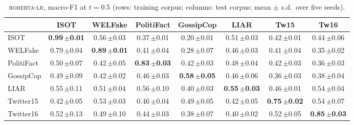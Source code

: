 \begin{table}[h]
\centering
\caption{\textsc{roberta-lr}, macro-F1 at $t=0.5$ (rows: training corpus; columns: test corpus; mean $\pm$ s.d.\ over five seeds).}
\scriptsize
\begin{tabular}{@{}lccccccc@{}}
\toprule
 & ISOT & WELFake & PolitiFact & GossipCop & LIAR & Tw15 & Tw16 \\
\midrule
ISOT & \textbf{0.99\,{\tiny$\pm$0.01}} & 0.56\,{\tiny$\pm$0.03} & 0.37\,{\tiny$\pm$0.01} & 0.20\,{\tiny$\pm$0.01} & 0.51\,{\tiny$\pm$0.03} & 0.42\,{\tiny$\pm$0.01} & 0.44\,{\tiny$\pm$0.06} \\
WELFake & 0.79\,{\tiny$\pm$0.04} & \textbf{0.89\,{\tiny$\pm$0.01}} & 0.41\,{\tiny$\pm$0.04} & 0.28\,{\tiny$\pm$0.07} & 0.46\,{\tiny$\pm$0.03} & 0.41\,{\tiny$\pm$0.04} & 0.35\,{\tiny$\pm$0.02} \\
PolitiFact & 0.50\,{\tiny$\pm$0.07} & 0.42\,{\tiny$\pm$0.05} & \textbf{0.83\,{\tiny$\pm$0.03}} & 0.42\,{\tiny$\pm$0.03} & 0.48\,{\tiny$\pm$0.04} & 0.42\,{\tiny$\pm$0.03} & 0.36\,{\tiny$\pm$0.03} \\
GossipCop & 0.49\,{\tiny$\pm$0.09} & 0.42\,{\tiny$\pm$0.02} & 0.46\,{\tiny$\pm$0.03} & \textbf{0.58\,{\tiny$\pm$0.05}} & 0.46\,{\tiny$\pm$0.06} & 0.36\,{\tiny$\pm$0.03} & 0.38\,{\tiny$\pm$0.04} \\
LIAR & 0.55\,{\tiny$\pm$0.11} & 0.51\,{\tiny$\pm$0.04} & 0.56\,{\tiny$\pm$0.10} & 0.40\,{\tiny$\pm$0.03} & \textbf{0.55\,{\tiny$\pm$0.03}} & 0.46\,{\tiny$\pm$0.01} & 0.54\,{\tiny$\pm$0.04} \\
Twitter15 & 0.42\,{\tiny$\pm$0.05} & 0.53\,{\tiny$\pm$0.03} & 0.46\,{\tiny$\pm$0.04} & 0.49\,{\tiny$\pm$0.05} & 0.42\,{\tiny$\pm$0.05} & \textbf{0.75\,{\tiny$\pm$0.02}} & 0.54\,{\tiny$\pm$0.07} \\
Twitter16 & 0.52\,{\tiny$\pm$0.13} & 0.49\,{\tiny$\pm$0.10} & 0.44\,{\tiny$\pm$0.03} & 0.38\,{\tiny$\pm$0.07} & 0.40\,{\tiny$\pm$0.02} & 0.52\,{\tiny$\pm$0.05} & \textbf{0.85\,{\tiny$\pm$0.03}} \\
\bottomrule
\end{tabular}
\end{table}

